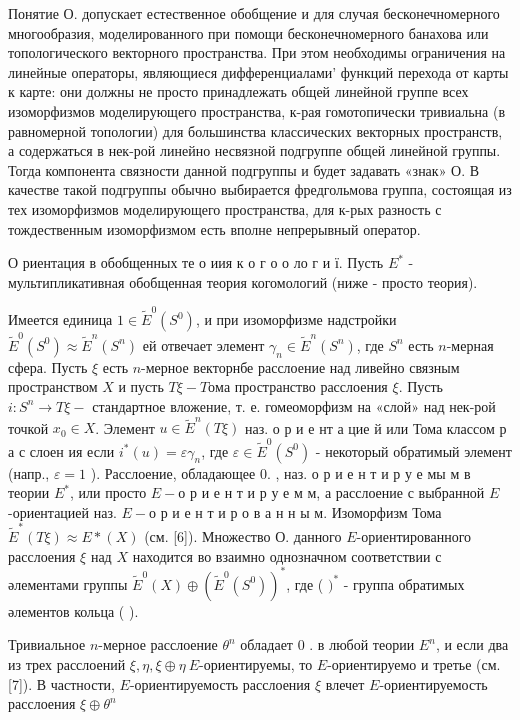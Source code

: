 \documentclass[10pt]{article}
\begin{document}
Понятие О. допускает естественное обобщение и для случая бесконечномерного многообразия, моделированного при помощи бесконечномерного банахова или топологического векторного пространства. При этом необходимы ограничения на линейные операторы, являющиеся дифференциалами' функций перехода от карты к карте: они должны не просто принадлежать общей линейной группе всех изоморфизмов моделирующего пространства, к-рая гомотопически тривиальна (в равномерной топологии) для большинства классических векторных пространств, а содержаться в нек-рой линейно несвязной подгруппе общей линейной группы. Тогда компонента связности данной подгруппы и будет задавать «знак» О. В качестве такой подгруппы обычно выбирается фредгольмова группа, состоящая из тех изоморфизмов моделирующего пространства, для к-рых разность с тождественным изоморфизмом есть вполне непрерывный оператор.



О риентация в обобщенных те о иия к о г о о ло г и ї. Пусть $E^{*}$ - мультипликативная обобщенная теория когомологий (ниже - просто теория).



Имеется единица $1 \in \tilde{E}^{0}\left(S^{0}\right)$, и при изоморфизме надстройки $\tilde{E}^{0}\left(S^{0}\right) \approx \tilde{E}^{n}\left(S^{n}\right)$ ей отвечает элемент $\gamma_{n} \in \tilde{E}^{n}\left(S^{n}\right)$, где $S^{n}$ есть $n$-мерная сфера. Пусть $\xi$ есть $n$-мерное векторнбе расслоение над ливейно связным пространством $X$ и пусть $T \xi-T о м а$ пространство расслоения $\xi$. Пусть $i: S^{n} \rightarrow T \xi-$ стандартное вложение, т. е. гомеоморфизм на «слой» над нек-рой точкой $x_{0} \in X$. Элемент $u \in \tilde{E}^{n}(T \xi)$ наз. о р и е нт а цие й или Тома классом р а с слоен ия если $i^{*}(u)=\varepsilon \gamma_{n}$, где $\varepsilon \in \tilde{E}^{0}\left(S^{0}\right)$ - некоторый обратимый элемент (напр., $\varepsilon=1$ ). Расслоение, обладающее 0. , наз. о р и е н т и р у е мы м в теории $E^{*}$, или просто $E-о$ р и е н т и р у е м м, а расслоение с выбранной $E$-ориентацией наз. $E-о$ р и е н т и р о в а н н ы м. Изоморфизм Тома $\tilde{E}^{*}(T \xi) \approx E *(X)$ (см. [6]). Множество О. данного $E$-ориентированного расслоения $\xi$ над $X$ находится во взаимно однозначном соответствии с әлементами группы $\tilde{E}^{0}(X) \oplus\left(\tilde{E}^{0}\left(S^{0}\right)\right)^{*}$, где ( $)^{*}$ - группа обратимых әлементов кольца ( ).



Тривиальное $n$-мерное расслоение $\theta^{n}$ обладает 0 . в любой теории $E^{n}$, и если два из трех расслоений $\xi, \eta, \xi \oplus \eta ~ E$-ориентируемы, то $E$-ориентируемо и третье (см. [7]). В частности, $E$-ориентируемость расслоения $\xi$ влечет $E$-ориентируемость расслоения $\xi \oplus \theta^{n}$
\end{document}
